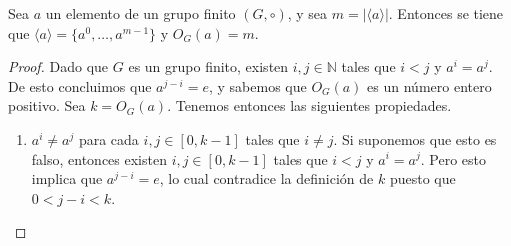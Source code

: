 \begin{proposition}\label{prop-orden}
Sea $a$ un elemento de un grupo finito $(G,\circ)$, y sea $m =
|\langle a \rangle|$. Entonces se tiene que $\langle a\rangle
= \{a^0,\ldots,a^{m-1}\}$ y $O_G(a) = m$.
\end{proposition}
\begin{proof}
Dado que $G$ es un grupo finito, existen $i,j \in \mathbb{N}$ tales que
$i < j$ y $a^i = a^j$. De esto concluimos que $a^{j-i} = e$, y sabemos
que $O_G(a)$ es un número entero positivo. Sea $k = O_G(a)$. Tenemos
entonces las siguientes propiedades.
\begin{enumerate}
\item
$a^i \neq a^j$ para cada $i,j\in [0,k-1]$ tales que  $i \neq j$. Si
suponemos que esto es falso, entonces existen $i,j\in [0,k-1]$ tales
que $i < j$ y $a^i = a^j$. Pero esto implica que $a^{j-i} = e$, lo
cual contradice la definición de $k$ puesto que $0 < j-i < k$.


\end{enumerate}
\end{proof}
